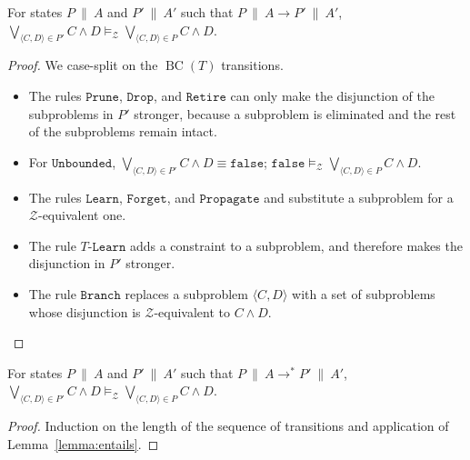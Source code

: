 \documentclass{llncs}
\newcommand{\tr}[1]{\ensuremath{\mathtt{#1}}}
\newcommand{\ttr}[1]{\ensuremath{T\text{-}\mathtt{#1}}}
\newcommand{\state}[2]{\ensuremath{#1\ \|\ #2}}
\newcommand{\subp}[2]{\ensuremath{\langle#1, #2\rangle}}
\newcommand{\Z}[0]{\ensuremath{\mathcal{Z}}}
\newcommand{\modelsz}[0]{\ensuremath{ \models_{\Z} }}
\newcommand{\trans}[0]{\ensuremath{ \longrightarrow }}
\newcommand{\transstar}[0]{\ensuremath{ \longrightarrow^{*} }}
\newcommand{\cd}{\subp{C}{D}}
\newcommand{\pa}{\state{P}{A}}
\newcommand{\paprime}{\state{P'}{A'}}
\newcommand{\bct}[0]{\ensuremath{\operatorname{BC}(T)}}
\begin{document}
\begin{lemma}
  \label{lemma:entails}
  For states {\pa} and {\paprime} such that $\pa \trans \paprime$,
  $\bigvee_{\cd \in P'} C \wedge D \modelsz \bigvee_{\cd \in P} C
  \wedge D$.
\end{lemma}
\begin{proof}
  We case-split on the \bct{} transitions.
  \begin{itemize}
  \item The rules \tr{Prune}, \tr{Drop}, and \tr{Retire} can only make
    the disjunction of the subproblems in $P'$ stronger, because a
    subproblem is eliminated and the rest of the subproblems remain
    intact.
  \item For \tr{Unbounded}, $\bigvee_{\cd \in P'} C \wedge D \equiv
    \mathtt{false}$; $\mathtt{false} \modelsz \bigvee_{\cd \in P} C
    \wedge D$.
  \item The rules \tr{Learn}, \tr{Forget}, and \tr{Propagate} and
    substitute a subproblem for a $\Z$-equivalent one.
  \item The rule \ttr{Learn} adds a constraint to a subproblem, and
    therefore makes the disjunction in $P'$ stronger.
  \item The rule \tr{Branch} replaces a subproblem \cd{} with a set of
    subproblems whose disjunction is $\Z$-equivalent to $C \wedge D$.
  \end{itemize}
\end{proof}

\begin{lemma}
  \label{lemma:entailsstar}
  For states {\pa} and {\paprime} such that $\pa \transstar \paprime$,
  $\bigvee_{\cd \in P'} C \wedge D \modelsz \bigvee_{\cd \in P} C
  \wedge D$.
\end{lemma}
\begin{proof}
  Induction on the length of the sequence of transitions and
  application of Lemma~\ref{lemma:entails}.
\end{proof}
\end{document}
